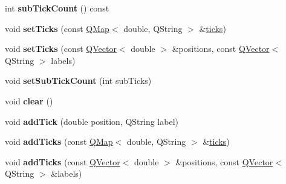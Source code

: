 \begin{DoxyCompactItemize}
\item 
int {\bfseries sub\+Tick\+Count} () const \hypertarget{class_q_c_p_axis_ticker_text_a47eabd2e4218d2cf3aee7c25e743396f}{}\label{class_q_c_p_axis_ticker_text_a47eabd2e4218d2cf3aee7c25e743396f}

\item 
void {\bfseries set\+Ticks} (const \hyperlink{class_q_map}{Q\+Map}$<$ double, Q\+String $>$ \&\hyperlink{class_q_c_p_axis_ticker_text_ac84622a6bb4f2a98474e185ecaf3189a}{ticks})\hypertarget{class_q_c_p_axis_ticker_text_a8cdf1f21940f1f53f5e3d30b2c74f5cf}{}\label{class_q_c_p_axis_ticker_text_a8cdf1f21940f1f53f5e3d30b2c74f5cf}

\item 
void {\bfseries set\+Ticks} (const \hyperlink{class_q_vector}{Q\+Vector}$<$ double $>$ \&positions, const \hyperlink{class_q_vector}{Q\+Vector}$<$ Q\+String $>$ labels)\hypertarget{class_q_c_p_axis_ticker_text_a69f3898cc1cf11d2437851f959faa1e8}{}\label{class_q_c_p_axis_ticker_text_a69f3898cc1cf11d2437851f959faa1e8}

\item 
void {\bfseries set\+Sub\+Tick\+Count} (int sub\+Ticks)\hypertarget{class_q_c_p_axis_ticker_text_a8cfa50c51183c90186892eeef978d571}{}\label{class_q_c_p_axis_ticker_text_a8cfa50c51183c90186892eeef978d571}

\item 
void {\bfseries clear} ()\hypertarget{class_q_c_p_axis_ticker_text_a21826d2fcd9a25c194d34d4f67aa1460}{}\label{class_q_c_p_axis_ticker_text_a21826d2fcd9a25c194d34d4f67aa1460}

\item 
void {\bfseries add\+Tick} (double position, Q\+String label)\hypertarget{class_q_c_p_axis_ticker_text_aada3db69e5fc6585aaa4ea5d89552eb0}{}\label{class_q_c_p_axis_ticker_text_aada3db69e5fc6585aaa4ea5d89552eb0}

\item 
void {\bfseries add\+Ticks} (const \hyperlink{class_q_map}{Q\+Map}$<$ double, Q\+String $>$ \&\hyperlink{class_q_c_p_axis_ticker_text_ac84622a6bb4f2a98474e185ecaf3189a}{ticks})\hypertarget{class_q_c_p_axis_ticker_text_aba34051300eecaefbedb2df8feff2d45}{}\label{class_q_c_p_axis_ticker_text_aba34051300eecaefbedb2df8feff2d45}

\item 
void {\bfseries add\+Ticks} (const \hyperlink{class_q_vector}{Q\+Vector}$<$ double $>$ \&positions, const \hyperlink{class_q_vector}{Q\+Vector}$<$ Q\+String $>$ \&labels)\hypertarget{class_q_c_p_axis_ticker_text_a8140c730e20b0050e1b702af3db00b2e}{}\label{class_q_c_p_axis_ticker_text_a8140c730e20b0050e1b702af3db00b2e}

\end{DoxyCompactItemize}
